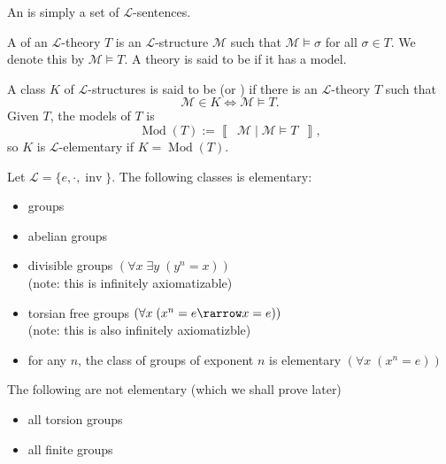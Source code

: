 \documentclass[notoc,notitlepage]{tufte-book}
\newcommand{\class}[1]{\left\llbracket \enspace #1 \enspace \right\rrbracket}
\DeclareMathOperator{\Mod}{Mod }
\DeclareMathOperator{\inv}{inv}
\begin{document}
\begin{defn}\label{defn:_l_theory}
  An  is simply a set of $\mathcal{L}$-sentences.
\end{defn}

\begin{defn}[Model]\label{defn:model}
  A  of an $\mathcal{L}$-theory $T$ is an $\mathcal{L}$-structure $\mathcal{M}$ such that $\mathcal{M} \models \sigma$ for all $\sigma \in T$. We denote this by $\mathcal{M} \models T$. A theory is said to be  if it has a model.
\end{defn}

\begin{defn}\label{defn:l_axiomatizable}
  A class $K$ of $\mathcal{L}$-structures is said to be  (or ) if there is an $\mathcal{L}$-theory $T$ such that
  \begin{equation*}
    \mathcal{M} \in K \iff \mathcal{M} \models T.
  \end{equation*}
  Given $T$, the models of $T$ is
  \begin{equation*}
    \Mod(T) := \class{ \mathcal{M} \mid \mathcal{M} \models T },
  \end{equation*}
  so $K$ is $\mathcal{L}$-elementary if $K = \Mod(T)$.
\end{defn}

\begin{eg}
  Let $\mathcal{L} = \{ e, \cdot, \inv \}$. The following classes is elementary:
  \begin{itemize}
    \item groups
    \item abelian groups
    \item divisible groups $(\forall x \; \exists y \; (y^n = x))$ \\
      (note: this is infinitely axiomatizable)
    \item torsian free groups $(\forall x \; (x^n = e \rarrow x = e))$ \\
      (note: this is also infinitely axiomatizble)
    \item for any $n$, the class of groups of exponent $n$ is elementary $(\forall x \; (x^n = e))$
  \end{itemize}
  The following are not elementary (which we shall prove later)
  \begin{itemize}
    \item all torsion groups
    \item all finite groups
  \end{itemize}
\end{eg}
\end{document}
